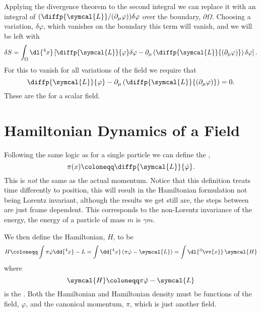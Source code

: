\documentclass[fleqn]{NotesClass}
\newcommand{\lagrangianDensity}{\symcal{L}}
\newcommand{\hamiltonianDensity}{\symcal{H}}
\begin{document}
    Applying the divergence theorem to the second integral we can replace it with an integral of \((\diffp{\lagrangianDensity}/{(\partial_\mu \varphi)}) \delta \varphi\) over the boundary, \(\partial \Omega\).
    Choosing a variation, \(\delta \varphi\), which vanishes on the boundary this term will vanish, and we will be left with
    \begin{equation}
        \delta S = \int_\Omega \dl{^4x} \left[ \diffp{\lagrangianDensity}{\varphi} \delta \varphi - \partial_\mu\left( \diffp{\lagrangianDensity}{(\partial_\mu \varphi)} \right) \delta \varphi \right].
    \end{equation}
    For this to vanish for all variations of the field we require that
    \begin{equation}
        \diffp{\lagrangianDensity}{\varphi} - \partial_\mu \left( \diffp{\lagrangianDensity}{(\partial_\mu \varphi)} \right) = 0.
    \end{equation}
    These are the  for a scalar field.
    
    \section{Hamiltonian Dynamics of a Field}
    Following the same logic as for a single particle we can define the ,
    \begin{equation}
        \pi(x) \coloneqq \diffp{\lagrangianDensity}{\dot{\varphi}}.
    \end{equation}
    This is \emph{not} the same as the actual momentum.
    Notice that this definition treats time differently to position, this will result in the Hamiltonian formulation not being Lorentz invariant, although the results we get still are, the steps between are just frame dependent.
    This corresponds to the non-Lorentz invariance of the energy, the energy of a particle of mass \(m\) is \(\gamma m\).
    
    We then define the Hamiltonian, \(H\), to be
    \begin{equation}
        H \coloneqq \int \pi \dot{\varphi} \dd{^4x} - L = \int \dd{^4x} \, (\pi \dot{\varphi} - \lagrangianDensity) = \int \dl{^3\vv{x}} \, \hamiltonianDensity
    \end{equation}
    where
    \begin{equation}
        \hamiltonianDensity \coloneqq \pi \dot{\varphi} - \lagrangianDensity
    \end{equation}
    is the .
    Both the Hamiltonian and Hamiltonian density must be functions of the field, \(\varphi\), and the canonical momentum, \(\pi\), which is just another field.
    
\end{document}
